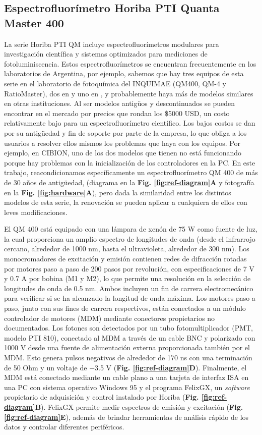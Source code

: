 \subsection{Espectrofluorímetro Horiba PTI Quanta Master 400}

La serie Horiba PTI QM incluye espectrofluorímetros modulares para investigación científica y sistemas optimizados para mediciones de fotoluminiscencia.
Estos espectrofluorímetros se encuentran frecuentemente en los laboratorios de Argentina, por ejemplo, sabemos que hay tres equipos de esta serie en el laboratorio de fotoquímica del INQUIMAE (QM400, QM-4 y RatioMaster), dos en  y uno en , y probablemente haya más de modelos similares en otras instituciones.
Al ser modelos antigüos y descontinuados se pueden encontrar en el mercado por precios que rondan los \$5000 USD, un costo relativamente bajo para un espectrofluorímetro científico.
Los bajos costos se dan por su antigüedad y fin de soporte por parte de la empresa, lo que obliga a los usuarios a resolver ellos mismos los problemas que haya con los equipos.
Por ejemplo, en CIBION, uno de los dos modelos que tienen no está funcionando porque hay problemas con la inicialización de los controladores en la PC.
En este trabajo, reacondicionamos específicamente un espectrofluorímetro QM 400 de más de 30 años de antigüedad,  (diagrama en la \textbf{Fig. \ref{fig:ref-diagram}A} y fotografía en la \textbf{Fig. \ref{fig:hardware}A}), pero dada la similaridad entre los distintos modelos de esta serie, la renovación se pueden aplicar a cualquiera de ellos con leves modificaciones. 

El QM 400 está equipado con una lámpara de xenón de 75 W como fuente de luz, la cual proporciona un amplio espectro de longitudes de onda (desde el infrarrojo cercano, alrededor de 1000 nm, hasta el ultravioleta, alrededor de 300 nm).
Los monocromadores de excitación y emisión contienen redes de difracción rotadas por motores paso a paso de 200 pasos por revolución, con especificaciones de 7 V y 0.7 A por bobina (M1 y M2), lo que permite una resolución en la selección de longitudes de onda de 0.5 nm. 
Ambos incluyen un fin de carrera electromecánico para verificar si se ha alcanzado la longitud de onda máxima.
Los motores paso a paso, junto con sus fines de carrera respectivos, están conectados a un módulo controlador de motores (MDM) mediante conectores propietarios no documentados. 
Los fotones son detectados por un tubo fotomultiplicador (PMT, modelo PTI 810), conectado al MDM a través de un cable BNC y polarizado con 1000 V desde una fuente de alimentación externa proporcionada también por el MDM. 
Esto genera pulsos negativos de alrededor de 170 ns con una terminación de 50 Ohm y un voltaje de −3.5 V (\textbf{Fig. \ref{fig:ref-diagram}D}). 
Finalmente, el MDM está conectado mediante un cable plano a una tarjeta de interfaz ISA en una PC con sistema operativo Windows 95 y el programa FelixGX, un \textit{software} propietario de adquisición y control instalado por Horiba (\textbf{Fig. \ref{fig:ref-diagram}B}).
FelixGX permite medir espectros de emisión y excitación (\textbf{Fig. \ref{fig:ref-diagram}E}), además de brindar herramientas de análisis rápido de los datos y controlar diferentes periféricos.

